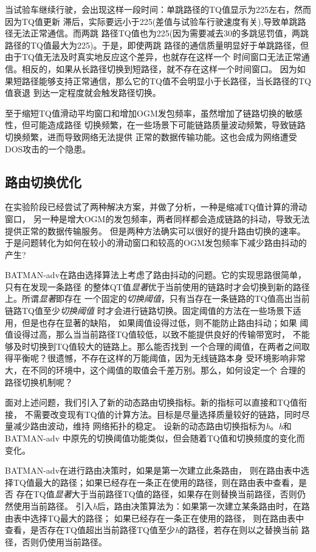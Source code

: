 当试验车继续行驶，会出现这样一段时间：单跳路径的TQ值显示为225左右，然而因为TQ值更新
滞后，实际要远小于225(差值与试验车行驶速度有关),导致单跳路径无法正常通信。而两跳
路径TQ值也为225(因为需要减去30的多跳惩罚值，两跳路径的TQ值最大为225)。于是，即使两跳
路径的通信质量明显好于单跳路径，但由于TQ值无法及时真实地反应这个差异，也就存在这样一个
时间窗口无法正常通信。相反的，如果从长路径切换到短路径，就不存在这样一个时间窗口。
因为如果短路径能够支持正常通信，那么它的TQ值不会明显小于长路径，当长路径的TQ值衰退
到达一定程度就会触发路径切换。

至于缩短TQ值滑动平均窗口和增加OGM发包频率，虽然增加了链路切换的敏感性，但可能造成路径
切换频繁，在一些场景下可能链路质量波动频繁，导致链路切换频繁，进而导致网络无法提供
正常的数据传输功能。这也会成为网络遭受DOS攻击的一个隐患。

\subsection{路由切换优化}
在实验阶段已经尝试了两种解决方案，并做了分析，一种是缩减TQ值计算的滑动窗口，
另一种是增大OGM的发包频率，两者同样都会造成链路的抖动，导致无法提供正常的数据传输服务。
但是两种方法确实可以很好的提升路由切换的速率。
于是问题转化为如何在较小的滑动窗口和较高的OGM发包频率下减少路由抖动的产生?

BATMAN-adv在路由选择算法上考虑了路由抖动的问题。它的实现思路很简单，只有在发现一条路径
的整体QT值\emph{显著}优于当前使用的链路时才会切换到新的路径上。所谓\emph{显著}即存在
一个固定的\emph{切换阈值}，只有当存在一条链路的TQ值高出当前链路TQ值至少\emph{切换阈值}
时才会进行链路切换。固定阈值的方法在一些场景下适用，但是也存在显著的缺陷，
如果阈值设得过低，则不能防止路由抖动；如果
阈值设得过高，那么当当前路径TQ值较低，以致不能提供良好的传输带宽时，
不能够及时切换到TQ值较大的链路上。那么能否找到
一个合理的阈值，在两者之间取得平衡呢？很遗憾，不存在这样的万能阈值，因为无线链路本身
受环境影响非常大，在不同的环境中，这个阈值的取值会千差万别。那么，如何设定一个
合理的路径切换机制呢？

面对上述问题，我们引入了新的动态路由切换指标。新的指标可以直接和TQ值衔接，
不需要改变现有TQ值的计算方法。目标是尽量选择质量较好的链路，同时尽量减少路由波动，维持
网络拓扑的稳定。
设新的动态路由切换指标为\emph{h}。\emph{h}和BATMAN-adv
中原先的切换阈值功能类似，但会随着TQ值和切换频度的变化而变化。

BATMAN-adv在进行路由决策时，如果是第一次建立此条路由，
则在路由表中选择TQ值最大的路径；如果已经存在一条正在使用的路径，则在路由表中查看，是否
存在TQ值\emph{显著}大于当前路径TQ值的路径，如果存在则替换当前路径，否则仍然使用当前路径。
引入\emph{h}后，路由决策算法为：如果第一次建立某条路由时，在路由表中选择TQ最大的路径；
如果已经存在一条正在使用的路径，
则在路由表中查看，是否存在TQ值超出当前路径TQ值至少\emph{h}的路径，若存在则以之替换当前
路径，否则仍使用当前路径。

